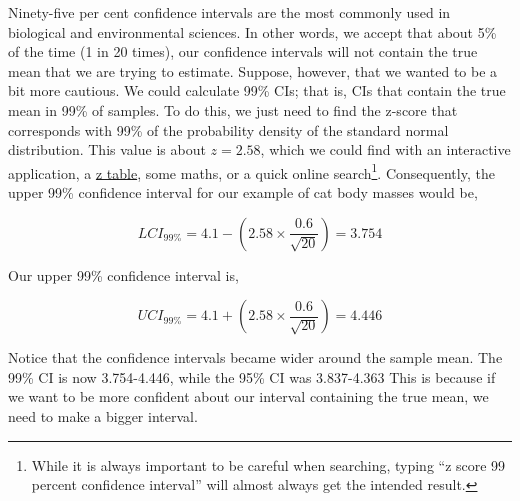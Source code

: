 \documentclass[
]{scrbook}
\begin{document}
Ninety-five per cent confidence intervals are the most commonly used in biological and environmental sciences.
In other words, we accept that about 5\% of the time (1 in 20 times), our confidence intervals will not contain the true mean that we are trying to estimate.
Suppose, however, that we wanted to be a bit more cautious.
We could calculate 99\% CIs; that is, CIs that contain the true mean in 99\% of samples.
To do this, we just need to find the z-score that corresponds with 99\% of the probability density of the standard normal distribution.
This value is about \(z = 2.58\), which we could find with an interactive application, a \href{https://www.z-table.com/}{z table}, some maths, or a quick online search\footnote{While it is always important to be careful when searching, typing ``z score 99 percent confidence interval'' will almost always get the intended result.}.
Consequently, the upper 99\% confidence interval for our example of cat body masses would be,

\[LCI_{99\%} = 4.1 - \left(2.58 \times \frac{0.6}{\sqrt{20}}\right) = 3.754\]

Our upper 99\% confidence interval is,

\[UCI_{99\%} = 4.1 + \left(2.58 \times \frac{0.6}{\sqrt{20}}\right) = 4.446\]

Notice that the confidence intervals became wider around the sample mean.
The 99\% CI is now 3.754-4.446, while the 95\% CI was 3.837-4.363
This is because if we want to be more confident about our interval containing the true mean, we need to make a bigger interval.
\end{document}
